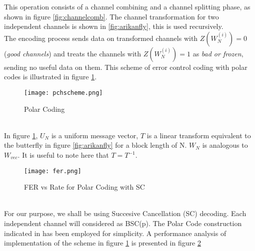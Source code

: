 \documentclass[
11pt, %
a4paper, %
oneside, %
headinclude,footinclude, %
BCOR5mm, %
]{scrartcl}
\begin{document}
This operation consists of a channel combining and a channel splitting phase, as shown in figure \ref{fig:channelcomb}. The channel transformation for two independent channels is shown in \ref{fig:arikanfly}, this is used recursively. \\The encoding process sends data on transformed channels with $Z(W^{(i)}_N)=0$  (\emph{good channels}) and treats the channels with $Z(W^{(i)}_N)=1$ as \emph{bad or frozen}, sending no useful data on them. This scheme of error control coding with polar codes is illustrated in figure \ref{fig:pchscheme}.
\begin{figure}[h]
 \begin{center}
    \texttt{[image: pchscheme.png]}
  \end{center}
  \caption{Polar Coding}
  \label{fig:pchscheme}
\end{figure}\\
In figure \ref{fig:pchscheme}, $U_N$ is a uniform message vector, $T$ is a linear transform equivalent to the butterfly in figure \ref{fig:arikanfly} for a block length of N. $W_N$ is analogous to $W_{vec}$. It is useful to note here that $T=T^{-1}$.
\begin{figure}[h]
  \begin{center}
    \texttt{[image: fer.png]}
  \end{center}
  \caption{FER vs Rate for Polar Coding with SC}
  \label{fig:fer}
\end{figure}\\
For our purpose, we shall be using Succesive Cancellation (SC) decoding. Each independent channel will considered as BSC(p). The Polar Code construction indicated in \cite{zhang} has been employed for simplicity. A performance analysis of implementation of the scheme in figure \ref{fig:pchscheme} is presented in figure \ref{fig:fer}    
\end{document}
